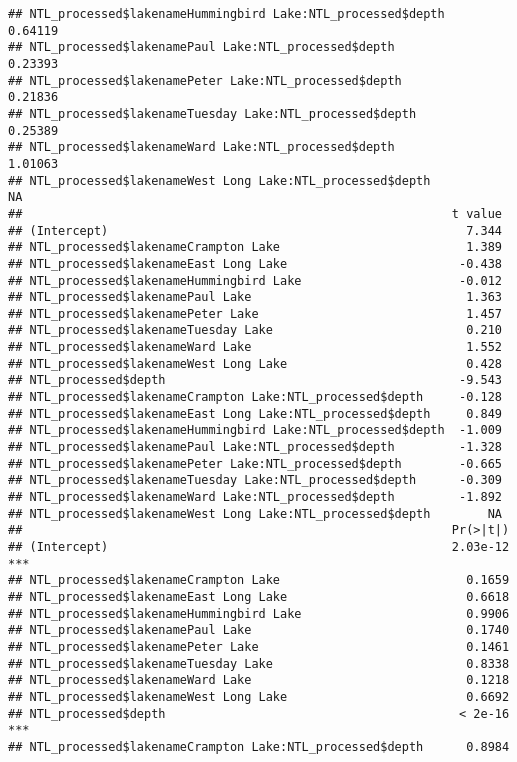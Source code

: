 \documentclass[]{article}
\begin{document}
\begin{verbatim}
## NTL_processed$lakenameHummingbird Lake:NTL_processed$depth    0.64119
## NTL_processed$lakenamePaul Lake:NTL_processed$depth           0.23393
## NTL_processed$lakenamePeter Lake:NTL_processed$depth          0.21836
## NTL_processed$lakenameTuesday Lake:NTL_processed$depth        0.25389
## NTL_processed$lakenameWard Lake:NTL_processed$depth           1.01063
## NTL_processed$lakenameWest Long Lake:NTL_processed$depth           NA
##                                                            t value
## (Intercept)                                                  7.344
## NTL_processed$lakenameCrampton Lake                          1.389
## NTL_processed$lakenameEast Long Lake                        -0.438
## NTL_processed$lakenameHummingbird Lake                      -0.012
## NTL_processed$lakenamePaul Lake                              1.363
## NTL_processed$lakenamePeter Lake                             1.457
## NTL_processed$lakenameTuesday Lake                           0.210
## NTL_processed$lakenameWard Lake                              1.552
## NTL_processed$lakenameWest Long Lake                         0.428
## NTL_processed$depth                                         -9.543
## NTL_processed$lakenameCrampton Lake:NTL_processed$depth     -0.128
## NTL_processed$lakenameEast Long Lake:NTL_processed$depth     0.849
## NTL_processed$lakenameHummingbird Lake:NTL_processed$depth  -1.009
## NTL_processed$lakenamePaul Lake:NTL_processed$depth         -1.328
## NTL_processed$lakenamePeter Lake:NTL_processed$depth        -0.665
## NTL_processed$lakenameTuesday Lake:NTL_processed$depth      -0.309
## NTL_processed$lakenameWard Lake:NTL_processed$depth         -1.892
## NTL_processed$lakenameWest Long Lake:NTL_processed$depth        NA
##                                                            Pr(>|t|)    
## (Intercept)                                                2.03e-12 ***
## NTL_processed$lakenameCrampton Lake                          0.1659    
## NTL_processed$lakenameEast Long Lake                         0.6618    
## NTL_processed$lakenameHummingbird Lake                       0.9906    
## NTL_processed$lakenamePaul Lake                              0.1740    
## NTL_processed$lakenamePeter Lake                             0.1461    
## NTL_processed$lakenameTuesday Lake                           0.8338    
## NTL_processed$lakenameWard Lake                              0.1218    
## NTL_processed$lakenameWest Long Lake                         0.6692    
## NTL_processed$depth                                         < 2e-16 ***
## NTL_processed$lakenameCrampton Lake:NTL_processed$depth      0.8984    

\end{verbatim}
\end{document}
